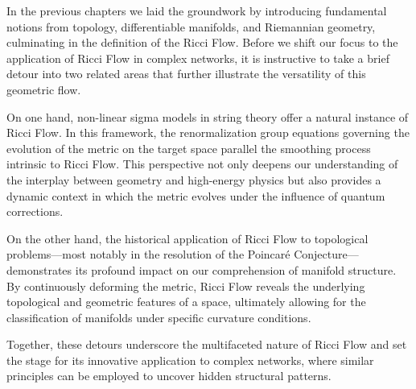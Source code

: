 In the previous chapters we laid the groundwork by introducing fundamental notions from topology, differentiable manifolds, and Riemannian geometry, culminating in the definition of the Ricci Flow. Before we shift our focus to the application of Ricci Flow in complex networks, it is instructive to take a brief detour into two related areas that further illustrate the versatility of this geometric flow.

On one hand, non-linear sigma models in string theory offer a natural instance of Ricci Flow. In this framework, the renormalization group equations governing the evolution of the metric on the target space parallel the smoothing process intrinsic to Ricci Flow. This perspective not only deepens our understanding of the interplay between geometry and high-energy physics but also provides a dynamic context in which the metric evolves under the influence of quantum corrections.

On the other hand, the historical application of Ricci Flow to topological problems—most notably in the resolution of the Poincaré Conjecture—demonstrates its profound impact on our comprehension of manifold structure. By continuously deforming the metric, Ricci Flow reveals the underlying topological and geometric features of a space, ultimately allowing for the classification of manifolds under specific curvature conditions.

Together, these detours underscore the multifaceted nature of Ricci Flow and set the stage for its innovative application to complex networks, where similar principles can be employed to uncover hidden structural patterns.